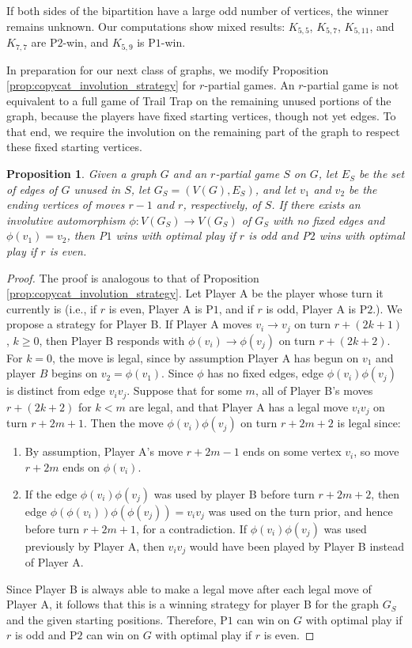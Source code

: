 \documentclass{article}
\theoremstyle{plain}
\newtheorem{proposition}[theorem]{Proposition}
\theoremstyle{definition}
\def\pone{{\rm{P}\ensuremath{1}}}
\def\ptwo{{\rm{P}\ensuremath{2}}}
\begin{document}
If both sides of the bipartition have a large odd number of vertices, the winner remains unknown. Our computations show mixed results: $K_{5, 5}$, $K_{5, 7}$, $K_{5, 11}$, and $K_{7,7}$ are \ptwo{}-win, and $K_{5,9}$ is \pone{}-win. 

In preparation for our next class of graphs, we modify Proposition \ref{prop:copycat_involution_strategy} for $r$-partial games. An $r$-partial game is not equivalent to a full game of {\sc Trail Trap} on the remaining unused portions of the graph, because the players have fixed starting vertices, though not yet edges. To that end, we require the involution on the remaining part of the graph to respect these fixed starting vertices. 

\begin{proposition}
\label{prop:CCI_revisited}
     Given a graph $G$ and an $r$-partial game $S$ on $G$, let $E_S$ be the set of edges of $G$ unused in $S$, let $G_S = (V(G), E_S)$, and let $v_1$ and $v_2$ be the ending vertices of moves $r-1$ and $r$, respectively, of $S$. If there exists an involutive automorphism $\phi: V(G_S) \rightarrow V(G_S)$ of $G_S$ with no fixed edges and $\phi(v_1) = v_2$, then \pone{} wins with optimal play if $r$ is odd and \ptwo{} wins with optimal play if $r$ is even. 
\end{proposition}
\begin{proof}
    The proof is analogous to that of Proposition \ref{prop:copycat_involution_strategy}. Let Player A be the player whose turn it currently is (i.e., if $r$ is even, Player A is \pone, and if $r$ is odd, Player A is \ptwo.). We propose a strategy for Player B. If Player A moves $v_{i}\to v_j$ on turn $r+(2k+1)$, $k \ge 0$, then Player B responds with $\phi(v_{i})\to \phi(v_j)$ on turn $r + (2k + 2)$. For $k = 0$, the move is legal, since by assumption Player A has begun on $v_1$ and player $B$ begins on $v_2 = \phi(v_1)$. Since $\phi$ has no fixed edges, edge $\phi(v_i)\phi(v_j)$ is distinct from edge $v_iv_j$. Suppose that for some $m$, all of Player B's moves $r+(2k+2)$ for $k < m$ are legal, and that Player A has a legal move $v_iv_j$ on turn $r+2m+1$. Then the move $\phi(v_i)\phi(v_j)$ on turn $r+2m+2$ is legal since:
    \begin{enumerate}
        \item [(i)] By assumption, Player A's move $r+2m - 1$ ends on some vertex $v_{i}$, so move $r+2m$ ends on $\phi(v_{i})$.
        \item [(ii)] If the edge $\phi(v_{i})\phi(v_j)$ was used by player B before turn $r+2m+2$, then edge $\phi(\phi(v_i))\phi(\phi(v_j)) = v_iv_j$ was used on the turn prior, and hence before turn $r+2m+1$, for a contradiction. If $\phi(v_{i})\phi(v_j)$ was used previously by Player A, then $v_iv_j$ would have been played by Player B instead of Player A.
    \end{enumerate}
    Since Player B is always able to make a legal move after each legal move of Player A, it follows that this is a winning strategy for player B for the graph $G_S$ and the given starting positions. Therefore, \pone{} can win on $G$ with optimal play if $r$ is odd and \ptwo{} can win on $G$ with optimal play if $r$ is even.
\end{proof}
\end{document}
